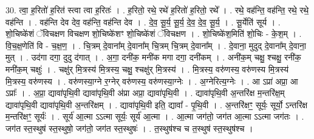 \documentclass[17pt]{extarticle}
\begin{document}
30. त्वा॒ ह॒रितो॑ ह॒रित॑ स्त्वा त्वा ह॒रितः॑ । . ह॒रितो॒ रथे॒ रथे॑ ह॒रितो॑ ह॒रितो॒ रथे᳚ । . रथे॒ वह॑न्ति॒ वह॑न्ति॒ रथे॒ रथे॒ वह॑न्ति । . वह॑न्ति देव देव॒ वह॑न्ति॒ वह॑न्ति देव । . दे॒व॒ सू॒र्य॒ सू॒र्य॒ दे॒व॒ दे॒व॒ सू॒र्य॒ । . सू॒र्येति॑ सूर्य । . शो॒चिष्के॑शं ॅविचक्षण विचक्षण शो॒चिष्के॑शꣳ शो॒चिष्के॑शं ॅविचक्षण । . शो॒चिष्के॑श॒मिति॑ शो॒चिः - के॒श॒म् । . वि॒च॒क्ष॒णेति॑ वि - च॒क्ष॒ण॒ । . चि॒त्रम् दे॒वाना᳚म् दे॒वाना᳚म् चि॒त्रम् चि॒त्रम् दे॒वाना᳚म् । . दे॒वाना॒ मुदुद् दे॒वाना᳚म् दे॒वाना॒ मुत् । . उद॑गा दगा॒ दुदु द॑गात् । . अ॒गा॒ दनी॑क॒ मनी॑क मगा दगा॒ दनी॑कम् । . अनी॑क॒म् चक्षु॒ श्चक्षु॒ रनी॑क॒ मनी॑क॒म् चक्षुः॑ । . चक्षु॑र् मि॒त्रस्य॑ मि॒त्रस्य॒ चक्षु॒ श्चक्षु॑र् मि॒त्रस्य॑ । . मि॒त्रस्य॒ वरु॑णस्य॒ वरु॑णस्य मि॒त्रस्य॑ मि॒त्रस्य॒ वरु॑णस्य । . वरु॑णस्या॒ग्ने र॒ग्नेर् वरु॑णस्य॒ वरु॑णस्या॒ग्नेः । . अ॒ग्नेरित्य॒ग्नेः । . आ ऽप्रा॑ अप्रा॒ आ ऽप्राः᳚ । . अ॒प्रा॒ द्यावा॑पृथि॒वी द्यावा॑पृथि॒वी अ॑प्रा अप्रा॒ द्यावा॑पृथि॒वी । . द्यावा॑पृथि॒वी अ॒न्तरि॑क्ष म॒न्तरि॑क्ष॒म् द्यावा॑पृथि॒वी द्यावा॑पृथि॒वी अ॒न्तरि॑क्षम् । . द्यावा॑पृथि॒वी इति॒ द्यावा᳚ - पृ॒थि॒वी । . अ॒न्तरि॑क्षꣳ॒॒ सूर्यः॒ सूर्यो॒ ऽन्तरि॑क्ष म॒न्तरि॑क्षꣳ॒॒ सूर्यः॑ । . सूर्य॑ आ॒त्मा ऽऽत्मा सूर्यः॒ सूर्य॑ आ॒त्मा । . आ॒त्मा जग॑तो॒ जग॑त आ॒त्मा ऽऽत्मा जग॑तः । . जग॑त स्त॒स्थुष॑ स्त॒स्थुषो॒ जग॑तो॒ जग॑त स्त॒स्थुषः॑ । . त॒स्थुष॑श्च च त॒स्थुष॑ स्त॒स्थुष॑श्च । \newline
\end{document}
